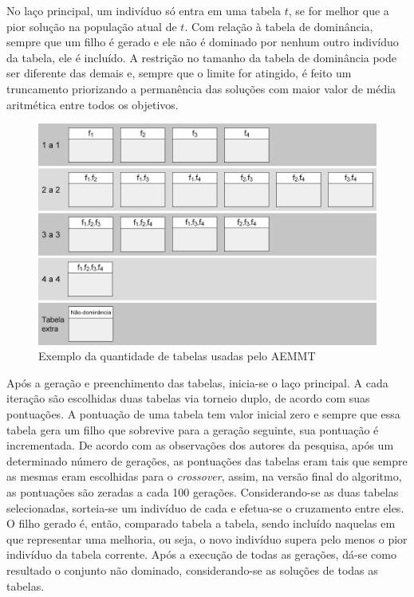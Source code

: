 No laço principal, um indivíduo só entra em uma tabela $t$, se for melhor que a pior solução na população atual de $t$. Com relação à tabela de dominância, sempre que um filho é gerado e ele não é dominado por nenhum outro indivíduo da tabela, ele é incluído. A restrição no tamanho da tabela de dominância pode ser diferente das demais e, sempre que o limite for atingido, é feito um truncamento priorizando a permanência das soluções com maior valor de média aritmética entre todos os objetivos.

\begin{figure}[!htbp]
	\centering
	\includegraphics[width=1\textwidth]{cap_otimizacao-multi/figs/aeemt-tabelas}
	\caption{\label{fig_aemmt_tabelas}Exemplo da quantidade de tabelas usadas pelo AEMMT}
\end{figure}

Após a geração e preenchimento das tabelas, inicia-se o laço principal. A cada iteração são escolhidas duas tabelas via torneio duplo, de acordo com suas pontuações. A pontuação de uma tabela tem valor inicial zero e sempre que essa tabela gera um filho que sobrevive para a geração seguinte, sua pontuação é incrementada. De acordo com as observações dos autores da pesquisa, após um determinado número de gerações, as pontuações das tabelas eram tais que sempre as mesmas eram escolhidas para o \textit{crossover}, assim, na versão final do algoritmo, as pontuações são zeradas a cada 100 gerações. Considerando-se as duas tabelas selecionadas, sorteia-se um indivíduo de cada e efetua-se o cruzamento entre eles. O filho gerado é, então, comparado tabela a tabela, sendo incluído naquelas em que representar uma melhoria, ou seja, o novo indivíduo supera pelo menos o pior indivíduo da tabela corrente. Após a execução de todas as gerações, dá-se como resultado o conjunto não dominado, considerando-se as soluções de todas as tabelas.

